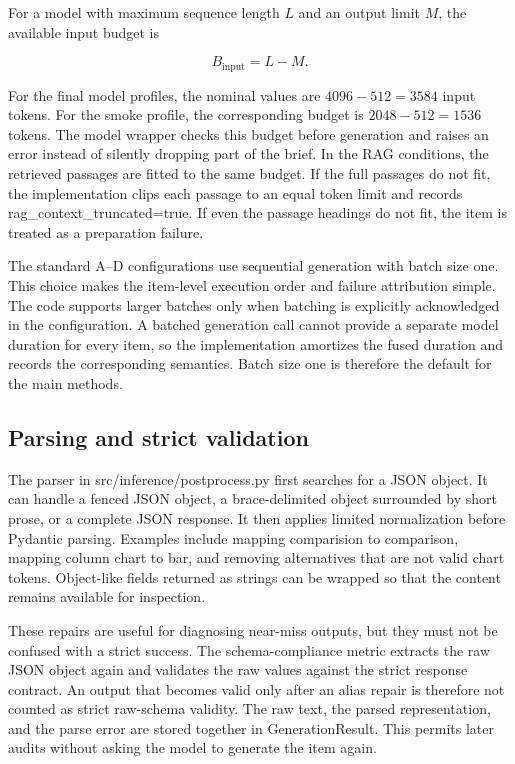 \endgroup

For a model with maximum sequence length \(L\) and an output limit \(M\), the available input budget is

\[
B_{\mathrm{input}} = L - M.
\]

For the final model profiles, the nominal values are \(4096-512=3584\) input tokens. For the smoke profile, the corresponding budget is \(2048-512=1536\) tokens. The model wrapper checks this budget before generation and raises an error instead of silently dropping part of the brief. In the RAG conditions, the retrieved passages are fitted to the same budget. If the full passages do not fit, the implementation clips each passage to an equal token limit and records rag\_context\_truncated=true. If even the passage headings do not fit, the item is treated as a preparation failure.

The standard A--D configurations use sequential generation with batch size one. This choice makes the item-level execution order and failure attribution simple. The code supports larger batches only when batching is explicitly acknowledged in the configuration. A batched generation call cannot provide a separate model duration for every item, so the implementation amortizes the fused duration and records the corresponding semantics. Batch size one is therefore the default for the main methods.

\subsection{Parsing and strict validation}

The parser in src/inference/postprocess.py first searches for a JSON object. It can handle a fenced JSON object, a brace-delimited object surrounded by short prose, or a complete JSON response. It then applies limited normalization before Pydantic parsing. Examples include mapping comparision to comparison, mapping column chart to bar, and removing alternatives that are not valid chart tokens. Object-like fields returned as strings can be wrapped so that the content remains available for inspection.

These repairs are useful for diagnosing near-miss outputs, but they must not be confused with a strict success. The schema-compliance metric extracts the raw JSON object again and validates the raw values against the strict response contract. An output that becomes valid only after an alias repair is therefore not counted as strict raw-schema validity. The raw text, the parsed representation, and the parse error are stored together in GenerationResult. This permits later audits without asking the model to generate the item again.

